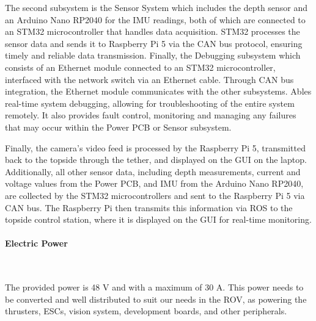 \begin{enumerate}[label=(\roman*), leftmargin=0pt, itemindent=20pt]
    \hspace{10pt} The second subsystem is the Sensor System which includes the depth sensor and an Arduino Nano RP2040 for the IMU readings, both of which are connected to an STM32 microcontroller that handles data acquisition. STM32 processes the sensor data and sends it to Raspberry Pi 5 via the CAN bus protocol, ensuring timely and reliable data transmission. Finally, the Debugging subsystem which consists of an Ethernet module connected to an STM32 microcontroller, interfaced with the network switch via an Ethernet cable. Through CAN bus integration, the Ethernet module communicates with the other subsystems. Ables real-time system debugging, allowing for troubleshooting of the entire system remotely. It also provides fault control, monitoring and managing any failures that may occur within the Power PCB or Sensor subsystem. 
    
    \hspace{10pt} Finally, the camera’s video feed is processed by the Raspberry Pi 5, transmitted back to the topside through the tether, and displayed on the GUI on the laptop. Additionally, all other sensor data, including depth measurements, current and voltage values from the Power PCB, and IMU from the Arduino Nano RP2040, are collected by the STM32 microcontrollers and sent to the Raspberry Pi 5 via CAN bus. The Raspberry Pi then transmits this information via ROS to the topside control station, where it is displayed on the GUI for real-time monitoring.
\end{enumerate}

\paragraph{Electric Power} \ \\
\vspace{-0.5cm}

The provided power is 48 V and with a maximum of 30 A. This power needs to be converted and well distributed to suit our needs in the ROV, as powering the thrusters, ESCs, vision system, development boards, and other peripherals.

